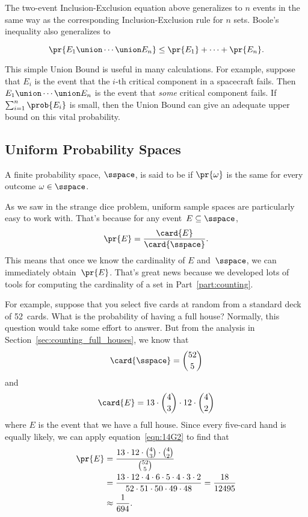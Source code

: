 The two-event Inclusion-Exclusion equation above generalizes to $n$ events
in the same way as the corresponding Inclusion-Exclusion rule for $n$
sets.  Boole's inequality also generalizes to
\begin{rul}
\begin{equation}
    \pr{E_1 \union \cdots \union E_n} \leq \pr{E_1} + \cdots + \pr{E_n}.
\end{equation}
\end{rul}
This simple Union Bound is useful in many calculations.  For example,
suppose that $E_i$ is the event that the $i$-th critical component in
a spacecraft fails.  Then $E_1 \union \cdots \union E_n$ is the event that
\emph{some} critical component fails.  If $\sum_{i = 1}^n \prob{E_i}$
is small, then the Union Bound can give an adequate upper bound on
this vital probability.

\subsection{Uniform Probability Spaces}

\begin{definition}\label{def:uniform_pspace}
A finite probability space, $\sspace$, is said to be  if
$\pr{\omega}$ is the same for every outcome $\omega \in \sspace$.
\end{definition}

As we saw in the strange dice problem, uniform sample spaces are
particularly easy to work with.  That's because for any event~$E
\subseteq \sspace$,
\begin{equation}\label{eqn:14G2}
    \pr{E} = \frac{\card{E}}{\card{\sspace}}.
\end{equation}
This means that once we know the cardinality of $E$ and~$\sspace$, we
can immediately obtain~$\pr{E}$.  That's great news because we
developed lots of tools for computing the cardinality of a set in
Part~\ref{part:counting}.

For example, suppose that you select five cards at random from a
standard deck of 52~cards.  What is the probability of having a full
house?  Normally, this question would take some effort to answer.  But
from the analysis in Section~\ref{sec:counting_full_houses}, we know
that
\begin{equation*}
    \card{\sspace} = \binom{52}{5}
\end{equation*}
and
\begin{equation*}
    \card{E} = 13 \cdot \binom{4}{3} \cdot 12 \cdot \binom{4}{2}
\end{equation*}
where $E$ is the event that we have a full house.  Since every
five-card hand is equally likely, we can apply
equation~\eqref{eqn:14G2} to find that
\begin{align*}
\pr{E}  &= \frac{13 \cdot 12 \cdot \binom{4}{3} \cdot \binom{4}{2}}
                {\binom{52}{5}} \\
        &= \frac{13 \cdot 12 \cdot 4 \cdot 6 \cdot 5 \cdot 4 \cdot 3 \cdot 2}
                {52 \cdot 51 \cdot 50 \cdot 49 \cdot 48} = \frac{18}{12495} \\
        &\approx \frac{1}{694}.
\end{align*}

